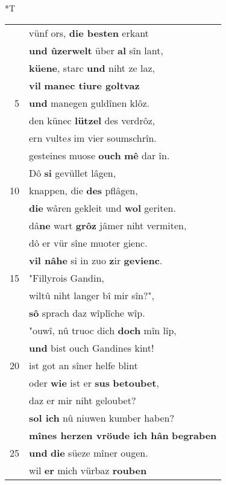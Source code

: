 \documentclass[8pt,a4paper,notitlepage]{article}
\begin{document}
\begin{table}[ht]
\begin{minipage}[t]{0.5\linewidth}
\end{minipage}
\hspace{0.5cm}
\begin{minipage}[t]{0.5\linewidth}
\small
\begin{center}*T
\end{center}
\begin{tabular}{rl}
 & vünf ors, \textbf{die besten} erkant\\ 
 & \textbf{und ûzerwelt} über \textbf{al} sîn lant,\\ 
 & \textbf{küene}, starc \textbf{und} niht ze laz,\\ 
 & \textbf{vil} \textbf{manec tiure goltvaz}\\ 
5 & \textbf{und} manegen guldînen klôz.\\ 
 & den künec \textbf{lützel} des verdrôz,\\ 
 & ern vulte\textit{s} im vier soumschrîn.\\ 
 & gesteines muose \textbf{ouch} \textbf{mê} dar în.\\ 
 & Dô \textbf{si} gevüllet lâgen,\\ 
10 & knappen, die \textbf{des} pflâgen,\\ 
 & \textbf{die} wâren gekleit und \textbf{wol} geriten.\\ 
 & dâ\textbf{ne} wart \textbf{grôz} jâmer niht vermiten,\\ 
 & dô er vür sîne muoter gienc.\\ 
 & \textbf{vil nâhe} si in zuo \textbf{z}ir \textbf{gevienc}.\\ 
15 & "Fillyrois Gandin,\\ 
 & wiltû niht langer bî mir sîn?",\\ 
 & \textbf{sô} sprach daz wîplîche wîp.\\ 
 & "ouwî, nû truoc dich \textbf{doch} mîn lîp,\\ 
 & \textbf{und} bist ouch Gandines kint!\\ 
20 & ist got an sîner helfe blint\\ 
 & oder \textbf{wie} ist er \textbf{sus} \textbf{betoubet},\\ 
 & daz er mir niht geloubet?\\ 
 & \textbf{sol ich} nû niuwen kumber haben?\\ 
 & \textbf{mînes herzen vröude ich hân} \textbf{begraben}\\ 
25 & \textbf{und} \textbf{die} süeze mîner ougen.\\ 
 & wil \textbf{er} mich vürbaz \textbf{rouben}\\ 

\end{tabular}
\end{minipage}
\end{table}
\end{document}
